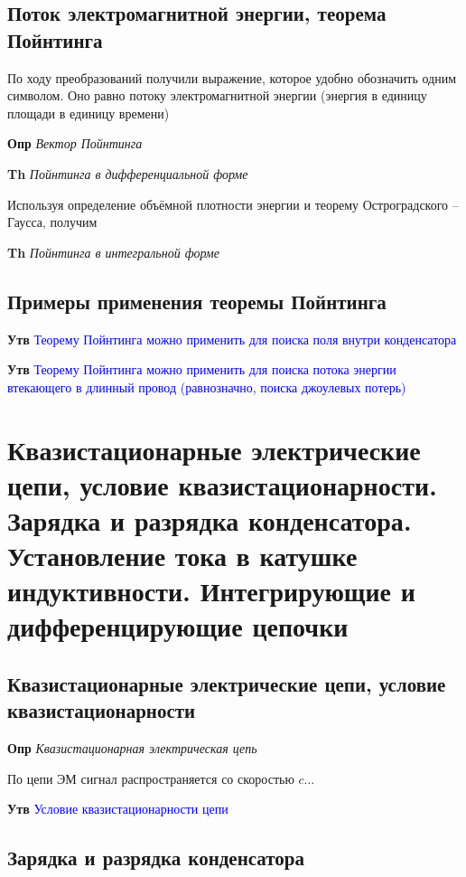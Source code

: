 \documentclass[a4paper, 14pt]{article}
\begin{document}
    \subsection{Поток электромагнитной энергии, теорема Пойнтинга}
    
    По ходу преобразований получили выражение, которое удобно обозначить одним символом.
    Оно равно потоку электромагнитной энергии (энергия в единицу площади в единицу времени)
    
    \textbf{Опр} \textit{Вектор Пойнтинга}
    
    \textbf{Th} \textit{Пойнтинга в дифференциальной форме}
    
    Используя определение объёмной плотности энергии и теорему Остроградского -- Гаусса, получим
    
    \textbf{Th} \textit{Пойнтинга в интегральной форме}
    
    \subsection{Примеры применения теоремы Пойнтинга}
    
    \textbf{Утв} \textcolor{blue}{Теорему Пойнтинга можно применить для поиска поля внутри конденсатора}
    
    \textbf{Утв} \textcolor{blue}{Теорему Пойнтинга можно применить для поиска потока энергии втекающего в
    длинный провод (равнозначно, поиска джоулевых потерь)}
    
    \section{Квазистационарные электрические цепи, условие квазистационарности.
    Зарядка и разрядка конденсатора.
    Установление тока в катушке индуктивности.
    Интегрирующие и дифференцирующие цепочки}
    
    \subsection{Квазистационарные электрические цепи, условие квазистационарности}
    
    \textbf{Опр} \textit{Квазистационарная электрическая цепь}
    
    По цепи ЭМ сигнал распространяется со скоростью $c \ldots$
    
    \textbf{Утв} \textcolor{blue}{Условие квазистационарности цепи}
    
    \subsection{Зарядка и разрядка конденсатора}
    
\end{document}
